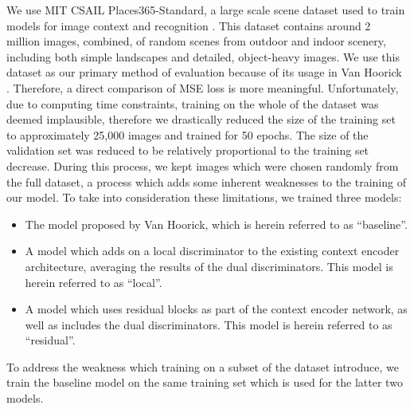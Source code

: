 \documentclass{article}
\begin{document}
We use MIT CSAIL Places365-Standard, a large scale scene dataset used to train models for image context and recognition \citep{zhou_places_2017}. This dataset contains around 2 million images, combined, of random scenes from outdoor and indoor scenery, including both simple landscapes and detailed, object-heavy images. We use this dataset as our primary method of evaluation because of its usage in Van Hoorick \citep{van_hoorick_image_2020}. Therefore, a direct comparison of MSE loss is more meaningful. Unfortunately, due to computing time constraints, training on the whole of the dataset was deemed implausible, therefore we drastically reduced the size of the training set to approximately 25,000 images and trained for 50 epochs. The size of the validation set was reduced to be relatively proportional to the training set decrease. During this process, we kept images which were chosen randomly from the full dataset, a process which adds some inherent weaknesses to the training of our model. To take into consideration these limitations, we trained three models: 
\begin{itemize}
\setlength{\partopsep}{0pt}
\setlength{\topsep}{0pt}
\setlength{\itemsep}{0pt}
	\item{The model proposed by Van Hoorick, which is herein referred to as ``baseline''.}
	\item{A model which adds on a local discriminator to the existing context encoder architecture, averaging the results of the dual discriminators. This model is herein referred to as ``local''.}
	\item{A model which uses residual blocks as part of the context encoder network, as well as includes the dual discriminators. This model is herein referred to as ``residual''.}
\end{itemize}
To address the weakness which training on a subset of the dataset introduce, we train the baseline model on the same training set which is used for the latter two models.
\end{document}
